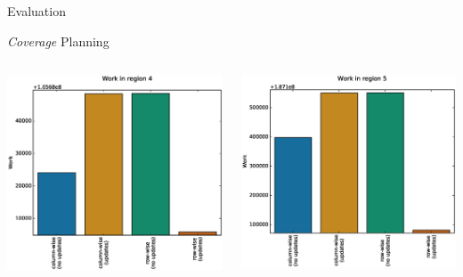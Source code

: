 \documentclass[9pt]{beamer}
\begin{document}
\begin{frame}{Evaluation}
    \begin{block}{\textit{Coverage} Planning}
        \begin{columns}
            \begin{column}{0.5\textwidth}
                \begin{center}
                    \includegraphics[width=\textwidth,trim={0cm 0cm 0cm 0cm},clip]{img/work_r4.eps}
                \end{center}
            \end{column}
            \begin{column}{0.5\textwidth}
                \begin{center}
                    \includegraphics[width=\textwidth,trim={0cm 0cm 0cm 0cm},clip]{img/work_r5.eps}

\end{center}
\end{column}
\end{columns}
\end{block}
\end{frame}
\end{document}
